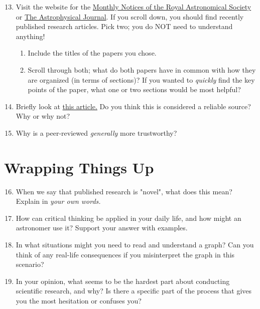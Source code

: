 \documentclass[11pt]{article}%
\begin{document}
\begin{enumerate}
\setcounter{enumi}{12}

\item Visit the website for the \href{https://academic.oup.com/mnras}{Monthly Notices of the Royal Astronomical Society} or \href{https://iopscience.iop.org/journal/0004-637X}{The Astrophysical Journal}. If you scroll down, you should find recently published research articles. Pick two; you do NOT need to understand anything!

\begin{enumerate}
    \item Include the titles of the papers you chose.
    \item Scroll through both; what do both papers have in common with how they are organized (in terms of sections)? If you wanted to \textit{quickly} find the key points of the paper, what one or two sections would be most helpful?
\end{enumerate}

\item Briefly look at \href{https://www.timesnownews.com/technology-science/explainers/what-are-white-holes-and-do-they-really-exist-explained-article-106564032}{this article.} Do you think this is considered a reliable source? Why or why not?
 
\item Why is a peer-reviewed \textit{generally} more trustworthy?

\end{enumerate}


\bigskip

\section{Wrapping Things Up}
\begin{enumerate}
\setcounter{enumi}{15}

\item When we say that published research is "novel", what does this mean? Explain in \textit{your own words.}

\item How can critical thinking be applied in your daily life, and how might an astronomer use it? Support your answer with examples.

\item In what situations might you need to read and understand a graph? Can you think of any real-life consequences if you misinterpret the graph in this scenario?

\item In your opinion, what seems to be the hardest part about conducting scientific research, and why? Is there a specific part of the process that gives you the most hesitation or confuses you?
 
\end{enumerate}
\end{document}
